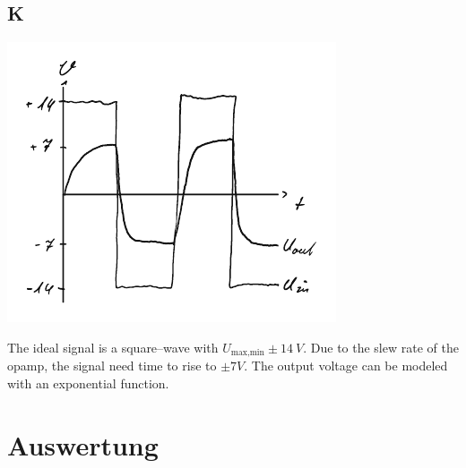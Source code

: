 \documentclass[a4paper,10pt]{article}
\newenvironment{Figure}
        {\par\medskip\noindent\minipage{\linewidth}}
        {\endminipage\par\medskip}
\numberwithin{equation}{section}
\begin{document}
\begin{multicols}{2}
        \subsection{K} \label{pre:K}
        \begin{Figure}
                \centering
                \includegraphics[width=\textwidth]{../plot/preK_crop.pdf}
        \end{Figure}
        \noindent The ideal signal is a square--wave with $U_\text{max,min}\pm \SI{14}{V}$.
        Due to the slew rate of the opamp, the signal need time to rise to $\pm \si{7}{V}$.
        The output voltage can be modeled with an exponential function.

        \newpage
        \section{Auswertung}
\end{multicols}

\clearpage
\listoffigures
\listoftables



\end{document}
